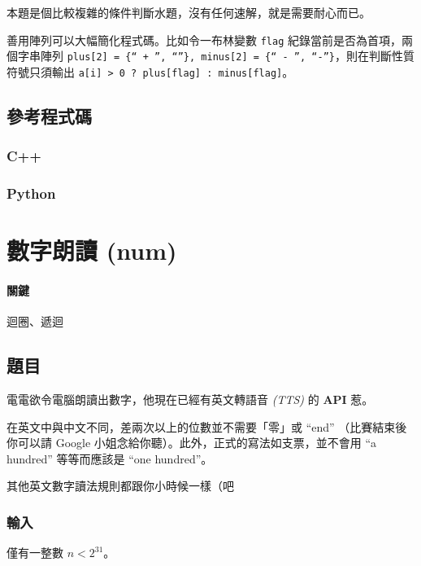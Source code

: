 \documentclass[a4paper,10pt]{article}
\begin{document}
本題是個比較複雜的條件判斷水題，沒有任何速解，就是需要耐心而已。

善用陣列可以大幅簡化程式碼。比如令一布林變數 \texttt{flag} 紀錄當前是否為首項，兩個字串陣列 \texttt{plus[2] = \{`` + '', ``''\}, minus[2] = \{`` - '', ``-''\}}，則在判斷性質符號只須輸出 \texttt{a[i] > 0 ? plus[flag] : minus[flag]}。

\subsection{參考程式碼}

\subsubsection{C++}



\subsubsection{Python}



\section{數字朗讀 (num)}

\paragraph{關鍵} 迴圈、遞迴

\subsection{題目}

電電欲令電腦朗讀出數字，他現在已經有英文轉語音 \textit{(TTS)} 的 \textbf{API} 惹。

在英文中與中文不同，差兩次以上的位數並不需要「零」或 ``end'' （比賽結束後你可以請 Google 小姐念給你聽）。此外，正式的寫法如支票，並不會用 ``a hundred'' 等等而應該是 ``one hundred''。

其他英文數字讀法規則都跟你小時候一樣（吧

\subsubsection{輸入}

僅有一整數 $n < 2^{31}$。
\end{document}
